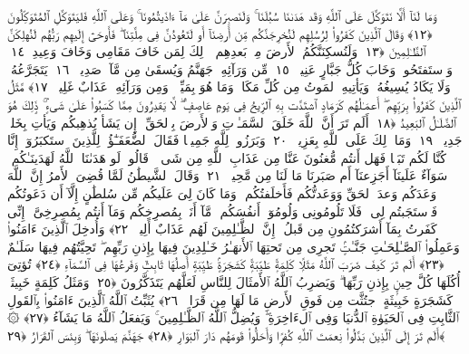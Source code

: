  وَمَا لَنَآ أَلَّا نَتَوَكَّلَ عَلَى ٱللَّهِ وَقَد هَدَىٰنَا سُبُلَنَا ۚ وَلَنَصبِرَنَّ عَلَىٰ مَآ ءَاذَيتُمُونَا ۚ وَعَلَى ٱللَّهِ فَليَتَوَكَّلِ ٱلمُتَوَكِّلُونَ ﴿١٢﴾
 وَقَالَ ٱلَّذِينَ كَفَرُوا۟ لِرُسُلِهِم لَنُخرِجَنَّكُم مِّن أَرضِنَآ أَو لَتَعُودُنَّ فِى مِلَّتِنَا ۖ فَأَوحَىٰٓ إِلَيهِم رَبُّهُم لَنُهلِكَنَّ ٱلظَّـٰلِمِينَ ﴿١٣﴾
 وَلَنُسكِنَنَّكُمُ ٱلأَرضَ مِنۢ بَعدِهِم ۚ ذَٟلِكَ لِمَن خَافَ مَقَامِى وَخَافَ وَعِيدِ ﴿١٤﴾
 وَٱستَفتَحُوا۟ وَخَابَ كُلُّ جَبَّارٍ عَنِيدٍۢ ﴿١٥﴾
 مِّن وَرَآئِهِۦ جَهَنَّمُ وَيُسقَىٰ مِن مَّآءٍۢ صَدِيدٍۢ ﴿١٦﴾
 يَتَجَرَّعُهُۥ وَلَا يَكَادُ يُسِيغُهُۥ وَيَأتِيهِ ٱلمَوتُ مِن كُلِّ مَكَانٍۢ وَمَا هُوَ بِمَيِّتٍۢ ۖ وَمِن وَرَآئِهِۦ عَذَابٌ غَلِيظٌۭ ﴿١٧﴾
 مَّثَلُ ٱلَّذِينَ كَفَرُوا۟ بِرَبِّهِم ۖ أَعمَـٰلُهُم كَرَمَادٍ ٱشتَدَّت بِهِ ٱلرِّيحُ فِى يَومٍ عَاصِفٍۢ ۖ لَّا يَقدِرُونَ مِمَّا كَسَبُوا۟ عَلَىٰ شَىءٍۢ ۚ ذَٟلِكَ هُوَ ٱلضَّلَـٰلُ ٱلبَعِيدُ ﴿١٨﴾
 أَلَم تَرَ أَنَّ ٱللَّهَ خَلَقَ ٱلسَّمَـٰوَٟتِ وَٱلأَرضَ بِٱلحَقِّ ۚ إِن يَشَأ يُذهِبكُم وَيَأتِ بِخَلقٍۢ جَدِيدٍۢ ﴿١٩﴾
 وَمَا ذَٟلِكَ عَلَى ٱللَّهِ بِعَزِيزٍۢ ﴿٢٠﴾
 وَبَرَزُوا۟ لِلَّهِ جَمِيعًۭا فَقَالَ ٱلضُّعَفَـٰٓؤُا۟ لِلَّذِينَ ٱستَكبَرُوٓا۟ إِنَّا كُنَّا لَكُم تَبَعًۭا فَهَل أَنتُم مُّغنُونَ عَنَّا مِن عَذَابِ ٱللَّهِ مِن شَىءٍۢ ۚ قَالُوا۟ لَو هَدَىٰنَا ٱللَّهُ لَهَدَينَـٰكُم ۖ سَوَآءٌ عَلَينَآ أَجَزِعنَآ أَم صَبَرنَا مَا لَنَا مِن مَّحِيصٍۢ ﴿٢١﴾
 وَقَالَ ٱلشَّيطَٰنُ لَمَّا قُضِىَ ٱلأَمرُ إِنَّ ٱللَّهَ وَعَدَكُم وَعدَ ٱلحَقِّ وَوَعَدتُّكُم فَأَخلَفتُكُم ۖ وَمَا كَانَ لِىَ عَلَيكُم مِّن سُلطَٰنٍ إِلَّآ أَن دَعَوتُكُم فَٱستَجَبتُم لِى ۖ فَلَا تَلُومُونِى وَلُومُوٓا۟ أَنفُسَكُم ۖ مَّآ أَنَا۠ بِمُصرِخِكُم وَمَآ أَنتُم بِمُصرِخِىَّ ۖ إِنِّى كَفَرتُ بِمَآ أَشرَكتُمُونِ مِن قَبلُ ۗ إِنَّ ٱلظَّـٰلِمِينَ لَهُم عَذَابٌ أَلِيمٌۭ ﴿٢٢﴾
 وَأُدخِلَ ٱلَّذِينَ ءَامَنُوا۟ وَعَمِلُوا۟ ٱلصَّـٰلِحَـٰتِ جَنَّـٰتٍۢ تَجرِى مِن تَحتِهَا ٱلأَنهَـٰرُ خَـٰلِدِينَ فِيهَا بِإِذنِ رَبِّهِم ۖ تَحِيَّتُهُم فِيهَا سَلَـٰمٌ ﴿٢٣﴾
 أَلَم تَرَ كَيفَ ضَرَبَ ٱللَّهُ مَثَلًۭا كَلِمَةًۭ طَيِّبَةًۭ كَشَجَرَةٍۢ طَيِّبَةٍ أَصلُهَا ثَابِتٌۭ وَفَرعُهَا فِى ٱلسَّمَآءِ ﴿٢٤﴾
 تُؤتِىٓ أُكُلَهَا كُلَّ حِينٍۭ بِإِذنِ رَبِّهَا ۗ وَيَضرِبُ ٱللَّهُ ٱلأَمثَالَ لِلنَّاسِ لَعَلَّهُم يَتَذَكَّرُونَ ﴿٢٥﴾
 وَمَثَلُ كَلِمَةٍ خَبِيثَةٍۢ كَشَجَرَةٍ خَبِيثَةٍ ٱجتُثَّت مِن فَوقِ ٱلأَرضِ مَا لَهَا مِن قَرَارٍۢ ﴿٢٦﴾
 يُثَبِّتُ ٱللَّهُ ٱلَّذِينَ ءَامَنُوا۟ بِٱلقَولِ ٱلثَّابِتِ فِى ٱلحَيَوٰةِ ٱلدُّنيَا وَفِى ٱلءَاخِرَةِ ۖ وَيُضِلُّ ٱللَّهُ ٱلظَّـٰلِمِينَ ۚ وَيَفعَلُ ٱللَّهُ مَا يَشَآءُ ﴿٢٧﴾
 ۞ أَلَم تَرَ إِلَى ٱلَّذِينَ بَدَّلُوا۟ نِعمَتَ ٱللَّهِ كُفرًۭا وَأَحَلُّوا۟ قَومَهُم دَارَ ٱلبَوَارِ ﴿٢٨﴾
 جَهَنَّمَ يَصلَونَهَا ۖ وَبِئسَ ٱلقَرَارُ ﴿٢٩﴾
